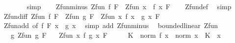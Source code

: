 \begin{isabellebody}
\ \ \ \ \ \ \isamarkupfalse%
\ simp\isanewline
\ \ \isamarkupfalse%
\isanewline
{}\isamarkupfalse%
%
\endisatagproof
{\isafoldproof}%
%
\isadelimproof
\isanewline
%
\endisadelimproof
\isanewline
{}\isamarkupfalse%
\ Zfun{\isacharunderscore}{\kern0pt}minus{\isacharcolon}{\kern0pt}\ {\isachardoublequoteopen}Zfun\ f\ F\ {\isasymLongrightarrow}\ Zfun\ {\isacharparenleft}{\kern0pt}{\isasymlambda}x{\isachardot}{\kern0pt}\ {\isacharminus}{\kern0pt}\ f\ x{\isacharparenright}{\kern0pt}\ F{\isachardoublequoteclose}\isanewline
%
\isadelimproof
\ \ %
\endisadelimproof
%
\isatagproof
{}\isamarkupfalse%
\ Zfun{\isacharunderscore}{\kern0pt}def\ \isamarkupfalse%
\ simp%
\endisatagproof
{\isafoldproof}%
%
\isadelimproof
\isanewline
%
\endisadelimproof
\isanewline
{}\isamarkupfalse%
\ Zfun{\isacharunderscore}{\kern0pt}diff{\isacharcolon}{\kern0pt}\ {\isachardoublequoteopen}Zfun\ f\ F\ {\isasymLongrightarrow}\ Zfun\ g\ F\ {\isasymLongrightarrow}\ Zfun\ {\isacharparenleft}{\kern0pt}{\isasymlambda}x{\isachardot}{\kern0pt}\ f\ x\ {\isacharminus}{\kern0pt}\ g\ x{\isacharparenright}{\kern0pt}\ F{\isachardoublequoteclose}\isanewline
%
\isadelimproof
\ \ %
\endisadelimproof
%
\isatagproof
{}\isamarkupfalse%
\ Zfun{\isacharunderscore}{\kern0pt}add\ {\isacharbrackleft}{\kern0pt}of\ f\ F\ {\isachardoublequoteopen}{\isasymlambda}x{\isachardot}{\kern0pt}\ {\isacharminus}{\kern0pt}\ g\ x{\isachardoublequoteclose}{\isacharbrackright}{\kern0pt}\ \isamarkupfalse%
\ {\isacharparenleft}{\kern0pt}simp\ add{\isacharcolon}{\kern0pt}\ Zfun{\isacharunderscore}{\kern0pt}minus{\isacharparenright}{\kern0pt}%
\endisatagproof
{\isafoldproof}%
%
\isadelimproof
\isanewline
%
\endisadelimproof
\isanewline
{}\isamarkupfalse%
\ {\isacharparenleft}{\kern0pt}\ bounded{\isacharunderscore}{\kern0pt}linear{\isacharparenright}{\kern0pt}\ Zfun{\isacharcolon}{\kern0pt}\isanewline
\ \ \ g{\isacharcolon}{\kern0pt}\ {\isachardoublequoteopen}Zfun\ g\ F{\isachardoublequoteclose}\isanewline
\ \ \ {\isachardoublequoteopen}Zfun\ {\isacharparenleft}{\kern0pt}{\isasymlambda}x{\isachardot}{\kern0pt}\ f\ {\isacharparenleft}{\kern0pt}g\ x{\isacharparenright}{\kern0pt}{\isacharparenright}{\kern0pt}\ F{\isachardoublequoteclose}\isanewline
%
\isadelimproof
%
\endisadelimproof
%
\isatagproof
{}\isamarkupfalse%
\ {\isacharminus}{\kern0pt}\isanewline
\ \ \isamarkupfalse%
\ K\ \ {\isachardoublequoteopen}norm\ {\isacharparenleft}{\kern0pt}f\ x{\isacharparenright}{\kern0pt}\ {\isasymle}\ norm\ x\ {\isacharasterisk}{\kern0pt}\ K{\isachardoublequoteclose}\ \ x\isanewline

\end{isabellebody}
